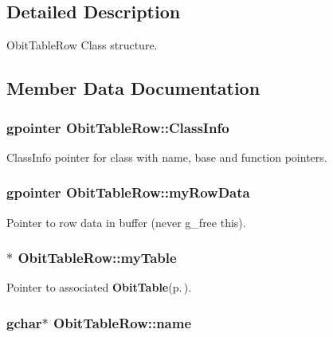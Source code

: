 \subsection{Detailed Description}
Obit\-Table\-Row Class structure. 



\subsection{Member Data Documentation}
\subsubsection{\setlength{\rightskip}{0pt plus 5cm}gpointer {\bf Obit\-Table\-Row::Class\-Info}}\label{structObitTableRow_o1}


Class\-Info pointer for class with name, base and function pointers. 

\subsubsection{\setlength{\rightskip}{0pt plus 5cm}gpointer {\bf Obit\-Table\-Row::my\-Row\-Data}}\label{structObitTableRow_o5}


Pointer to row data in buffer (never g\_\-free this). 

\subsubsection{$\ast$ {\bf Obit\-Table\-Row::my\-Table}}\label{structObitTableRow_o4}


Pointer to associated {\bf Obit\-Table}{\rm (p.\,\pageref{structObitTable})}. 

\subsubsection{\setlength{\rightskip}{0pt plus 5cm}gchar$\ast$ {\bf Obit\-Table\-Row::name}}\label{structObitTableRow_o3}


